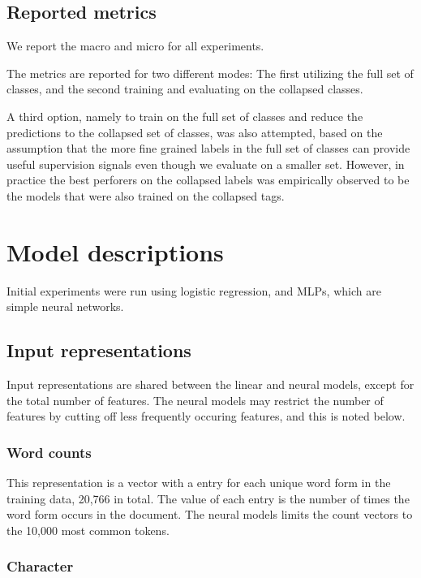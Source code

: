 \subsection{Reported metrics}

We report the macro and micro \FI for all experiments.

The metrics are reported for two different modes: The first utilizing the
full set of classes, and the second training and evaluating on the collapsed
classes.

A third option, namely to train on the full set of classes and reduce the
predictions to the collapsed set of classes, was also attempted, based on the
assumption that the more fine grained labels in the full set of classes can
provide useful supervision signals even though we evaluate on a smaller set.
However, in practice the best perforers on the collapsed labels was
empirically observed to be the models that were also trained on the collapsed
tags.


\section{Model descriptions}

Initial experiments were run using logistic regression, and \acp{MLP}, which
are simple neural networks.

\subsection{Input representations}

Input representations are shared between the linear and neural models, except
for the total number of features. The neural models may restrict the number
of features by cutting off less frequently occuring features, and this is
noted below.

\subsubsection*{Word counts}

This representation is a vector with a entry for each unique word form in the
training data, 20,766 in total. The value of each entry is the number of
times the word form occurs in the document. The neural models limits the
count vectors to the 10,000 most common tokens.

\subsubsection*{Character \ngrams}

